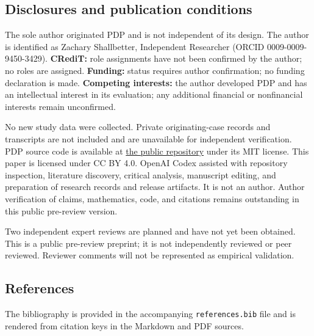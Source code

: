 \documentclass[
  english,
]{article}
\begin{document}
\subsection{Disclosures and publication
conditions}\label{disclosures-and-publication-conditions}

The sole author originated PDP and is not independent of its design. The
author is identified as Zachary Shallbetter, Independent Researcher
(ORCID 0009-0009-9450-3429). \textbf{CRediT:} role assignments have not
been confirmed by the author; no roles are assigned. \textbf{Funding:}
status requires author confirmation; no funding declaration is made.
\textbf{Competing interests:} the author developed PDP and has an
intellectual interest in its evaluation; any additional financial or
nonfinancial interests remain unconfirmed.

No new study data were collected. Private originating-case records and
transcripts are not included and are unavailable for independent
verification. PDP source code is available at
\href{https://github.com/zachshallbetter/polymorphic-decision-protocol}{the
public repository} under its MIT license. This paper is licensed under
CC BY 4.0. OpenAI Codex assisted with repository inspection, literature
discovery, critical analysis, manuscript editing, and preparation of
research records and release artifacts. It is not an author. Author
verification of claims, mathematics, code, and citations remains
outstanding in this public pre-review version.

Two independent expert reviews are planned and have not yet been
obtained. This is a public pre-review preprint; it is not independently
reviewed or peer reviewed. Reviewer comments will not be represented as
empirical validation.

\subsection{References}\label{references}

The bibliography is provided in the accompanying \texttt{references.bib}
file and is rendered from citation keys in the Markdown and PDF sources.
\end{document}
